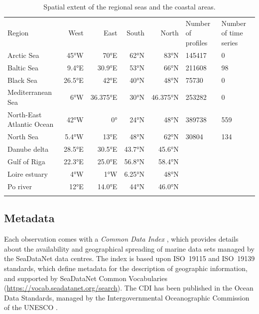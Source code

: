 \documentclass[essd, manuscript]{copernicus}
\begin{document}
\begin{table}[h!]
\caption{Spatial extent of the regional seas and the coastal areas.\label{tab:regions}}
\begin{tabular}{lrrrrll}
\tophline
Region	 					& West		& East		& South 		& North 		& Number of profiles	& Number of time series\\ 
\middlehline	
Arctic Sea 					& 45°W 		& 70°E		& 62°N		& 83°N		& 145417		& 0		\\
Baltic Sea					& 9.4°E		& 30.9°E		& 53°N		& 66°N		& 211608		& 98		\\
Black Sea					& 26.5°E 	& 42°E		& 40°N		& 48°N	 	& 75730		& 0		\\
Mediterranean Sea			& 6°W		& 36.375°E	& 30°N		& 46.375°N	& 253282		& 0		\\
North-East Atlantic Ocean 	& 42°W		& 0° 		& 24°N		& 48°N		& 389738		& 559	\\
North Sea 					& 5.4°W 		& 13°E		& 48°N		& 62°N		& 30804		& 134	\\
\middlehline	
Danube delta				& 28.5°E		& 30.5°E		& 43.7°N 	& 45.6°N		&			& \\
Gulf of Riga 				& 22.3°E 	& 25.0°E 	& 56.8°N 	& 58.4°N		&			& \\
Loire estuary				& 4°W		& 1°W 		& 6.25°N		& 48°N		&			& \\
Po river					 & 12°E		& 14.0°E		& 44°N		& 46.0°N		&			& \\
\bottomhline
\end{tabular}
\end{table}

\subsection{Metadata\label{sec:metadata}}

Each observation comes with a \textit{Common Data Index} \citep[CDI,][]{Schaap2021,Schaap2022}, which provides details about the availability and geographical spreading of marine data sets managed by the SeaDataNet data centres. The index is based upon ISO~19115 and ISO~19139 standards, which define metadata for the description of geographic information, and supported by SeaDataNet Common Vocabularies (\url{https://vocab.seadatanet.org/search}). The CDI has been published in the Ocean Data Standards, managed by the Intergovernmental Oceanographic Commission of the UNESCO \citet{Schaap2021}.
\end{document}
